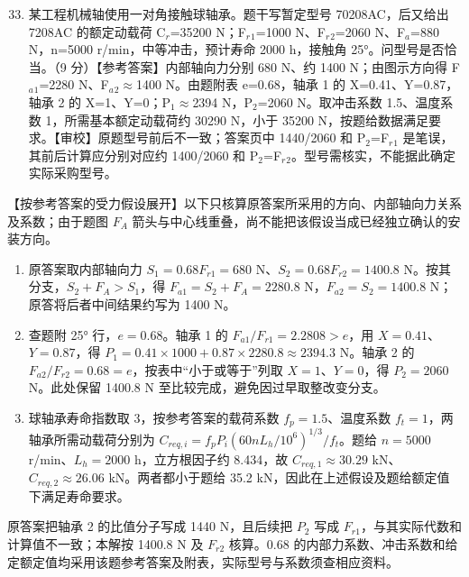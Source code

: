 \documentclass[zihao=5,a4paper,UTF8,fontset=fandol]{ctexart}
\begin{document}
\begin{enumerate}
\setcounter{enumi}{32}
\item 
某工程机械轴使用一对角接触球轴承。题干写暂定型号 70208AC，后又给出 7208AC 的额定动载荷 C$_{r}$=35200 N；F$_{r}$$_{1}$=1000 N、F$_{r}$$_{2}$=2060 N、F$_{a}$=880 N，n=5000 r/min，中等冲击，预计寿命 2000 h，接触角 25°。问型号是否恰当。（9 分）【参考答案】内部轴向力分别 680 N、约 1400 N；由图示方向得 F$_{a}$$_{1}$=2280 N、F$_{a}$$_{2}$$\approx$1400 N。由题附表 e=0.68，轴承 1 的 X=0.41、Y=0.87，轴承 2 的 X=1、Y=0；P$_{1}$$\approx$2394 N，P$_{2}$=2060 N。取冲击系数 1.5、温度系数 1，所需基本额定动载荷约 30290 N，小于 35200 N，按题给数据满足要求。【审校】原题型号前后不一致；答案页中 1440/2060 和 P$_{2}$=F$_{r}$$_{1}$ 是笔误，其前后计算应分别对应约 1400/2060 和 P$_{2}$=F$_{r}$$_{2}$。型号需核实，不能据此确定实际采购型号。



\end{enumerate}

【按参考答案的受力假设展开】以下只核算原答案所采用的方向、内部轴向力关系及系数；由于题图 $F_A$ 箭头与中心线重叠，尚不能把该假设当成已经独立确认的安装方向。


\begin{enumerate}
\item 
原答案取内部轴向力 $S_1=0.68F_{r1}=680$ N、$S_2=0.68F_{r2}=1400.8$ N。按其分支，$S_2+F_A>S_1$，得 $F_{a1}=S_2+F_A=2280.8$ N，$F_{a2}=S_2=1400.8$ N；原答将后者中间结果约写为 1400 N。


\item 
查题附 25° 行，$e=0.68$。轴承 1 的 $F_{a1}/F_{r1}=2.2808>e$，用 $X=0.41$、$Y=0.87$，得 $P_1=0.41\times1000+0.87\times2280.8\approx2394.3$ N。轴承 2 的 $F_{a2}/F_{r2}=0.68=e$，按表中“小于或等于”列取 $X=1$、$Y=0$，得 $P_2=2060$ N。此处保留 1400.8 N 至比较完成，避免因过早取整改变分支。


\item 
球轴承寿命指数取 3，按参考答案的载荷系数 $f_p=1.5$、温度系数 $f_t=1$，两轴承所需动载荷分别为 $C_{req,i}=f_pP_i(60nL_h/10^6)^{1/3}/f_t$。题给 $n=5000$ r/min、$L_h=2000$ h，立方根因子约 8.434，故 $C_{req,1}\approx30.29$ kN、$C_{req,2}\approx26.06$ kN。两者都小于题给 35.2 kN，因此在上述假设及题给额定值下满足寿命要求。



\end{enumerate}

原答案把轴承 2 的比值分子写成 1440 N，且后续把 $P_2$ 写成 $F_{r1}$，与其实际代数和计算值不一致；本解按 1400.8 N 及 $F_{r2}$ 核算。0.68 的内部力系数、冲击系数和给定额定值均采用该题参考答案及附表，实际型号与系数须查相应资料。
\end{document}
